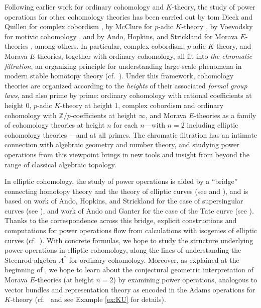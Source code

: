 \documentclass{gtpart}
\theoremstyle{definition}
\theoremstyle{remark}
\newcommand{\mb}[1]{\mathbb{#1}}
\newcommand{\BZ}{{\mb Z}}
\numberwithin{equation}{section}
\numberwithin{thm}{section}
\begin{document}
Following earlier work for ordinary cohomology and $K$-theory, the study 
of power operations for other cohomology theories has been carried out 
by tom Dieck and Quillen for complex cobordism 
\cite{tomdieck, quillenmu}, by McClure for $p$-adic $K$-theory 
\cite{mcclure, H_infty}, by Voevodsky for motivic cohomology \cite{V}, 
and by Ando, Hopkins, and Strickland for Morava $E$-theories 
\cite{AHS04}, among others.  In particular, complex cobordism, $p$-adic 
$K$-theory, and Morava $E$-theories, together with ordinary cohomology, 
all fit into {\em the chromatic filtration}, an organizing principle for 
understanding large-scale phenomena in modern stable homotopy theory 
(cf.~\cite{quillenfgl, orange, tafoverview}).  Under this framework, 
cohomology theories are organized according to the {\em heights} of 
their associated {\em formal group laws}, and also prime by prime: 
ordinary cohomology with rational coefficients at height 0, $p$-adic 
$K$-theory at height 1, complex cobordism and ordinary cohomology with 
$\BZ/p$-coefficients at height $\infty$, and Morava $E$-theories as a 
family of cohomology theories at height $n$ for each $n$---with $n = 2$ 
including elliptic cohomology theories 
\cite{morava, hopkinsmahowald, survey}---and at all primes.  The 
chromatic filtration has an intimate connection with algebraic geometry 
and number theory, and studying power operations from this viewpoint 
brings in new tools and insight from beyond the range of classical 
algebraic topology.  

In elliptic cohomology, the study of power operations is aided by a 
``bridge'' connecting homotopy theory and the theory of elliptic curves 
(see \cite[Theorem B]{cong} and \cite[2.9.1]{KM}), and is based on work 
of Ando, Hopkins, and Strickland for the case of supersingular curves 
(see \cite{AHS04}), and work of Ando and Ganter for the case of the Tate 
curve (see \cite{Ando00, ganter}).  Thanks to the correspondence across 
this bridge, explicit constructions and computations for power 
operations flow from calculations with isogenies of elliptic curves 
(cf.~\cite{h2p2}).  With concrete formulas, we hope to study the 
structure underlying power operations in elliptic cohomology, along the 
lines of understanding the Steenrod algebra $A^*$ for ordinary 
cohomology.  Moreover, as explained at the beginning of \cite{Ando95}, 
we hope to learn about the conjectural geometric interpretation of 
Morava $E$-theories (at height $n = 2$) by examining power operations, 
analogous to vector bundles and representation theory as encoded in the 
Adams operations for $K$-theory (cf.~\cite{adamsvector, atiyah} and see 
Example \ref{ex:KU} for details).  
\end{document}
